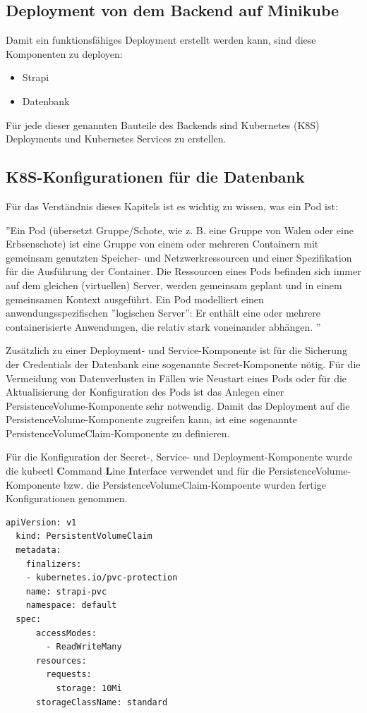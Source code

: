 \subsection{Deployment von dem Backend auf Minikube}

Damit ein funktionsfähiges Deployment erstellt werden kann, sind diese Komponenten zu deployen:
\begin{itemize}
  \item Strapi
  \item Datenbank
\end{itemize}

Für jede dieser genannten Bauteile des Backends sind Kubernetes (K8S) Deployments und Kubernetes Services zu erstellen.

\subsection{K8S-Konfigurationen für die Datenbank}

Für das Verständnis dieses Kapitels ist es wichtig zu wissen, was ein Pod ist:

''Ein Pod (übersetzt Gruppe/Schote, wie z. B. eine Gruppe von Walen oder eine Erbsenschote)
ist eine Gruppe von einem oder mehreren Containern mit gemeinsam genutzten Speicher- und
Netzwerkressourcen und einer Spezifikation für die Ausführung der Container.
Die Ressourcen eines Pods befinden sich immer auf dem gleichen (virtuellen) Server,
werden gemeinsam geplant und in einem gemeinsamen Kontext ausgeführt.
Ein Pod modelliert einen anwendungsspezifischen ''logischen Server'': Er enthält eine oder mehrere
containerisierte Anwendungen, die relativ stark voneinander abhängen.
''
\cite{pod}

Zusätzlich zu einer Deployment- und Service-Komponente ist für die Sicherung
der Credentials der Datenbank eine sogenannte
Secret-Komponente nötig.
Für die Vermeidung von Datenverlusten in Fällen
wie Neustart eines Pods oder für die Aktualisierung
der Konfiguration des Pods ist
das Anlegen einer PersistenceVolume-Komponente sehr notwendig.
Damit das Deployment auf die PersistenceVolume-Komponente zugreifen kann, ist eine sogenannte PersistenceVolumeClaim-Komponente zu definieren.

Für die Konfiguration der Secret-, Service- und Deployment-Komponente wurde die kubectl \textbf{C}ommand \textbf{L}ine \textbf{I}nterface verwendet
und für die PersistenceVolume-Komponente bzw. die PersistenceVolumeClaim-Kompoente wurden fertige Konfigurationen genommen.
\begin{lstlisting}[caption=K8S PVC]
  apiVersion: v1
  kind: PersistentVolumeClaim
  metadata:
    finalizers:
    - kubernetes.io/pvc-protection
    name: strapi-pvc
    namespace: default
  spec:
      accessModes:
        - ReadWriteMany
      resources:
        requests:
          storage: 10Mi
      storageClassName: standard
    
\end{lstlisting}



